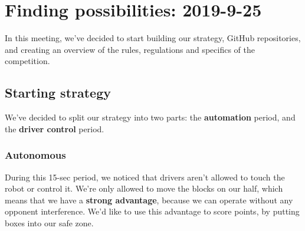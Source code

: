 \documentclass[../../main.tex]{subfiles}
\begin{document}
\section{\textbf{Finding possibilities}: 2019-9-25}
In this meeting, we've decided to start building our strategy, GitHub repositories, and creating an overview of the rules, regulations and specifics of the competition.

\subsection{Starting strategy}
We've decided to split our strategy into two parts: the \textbf{automation} period, and the \textbf{driver control} period.

\subsubsection{Autonomous}
During this 15-sec period, we noticed that drivers aren't allowed to touch the robot or control it. We're only allowed to move the blocks on our half, which means that we have a \textbf{strong advantage}, because we can operate without any opponent interference. We'd like to use this advantage to score points, by putting boxes into our safe zone.
\end{document}
